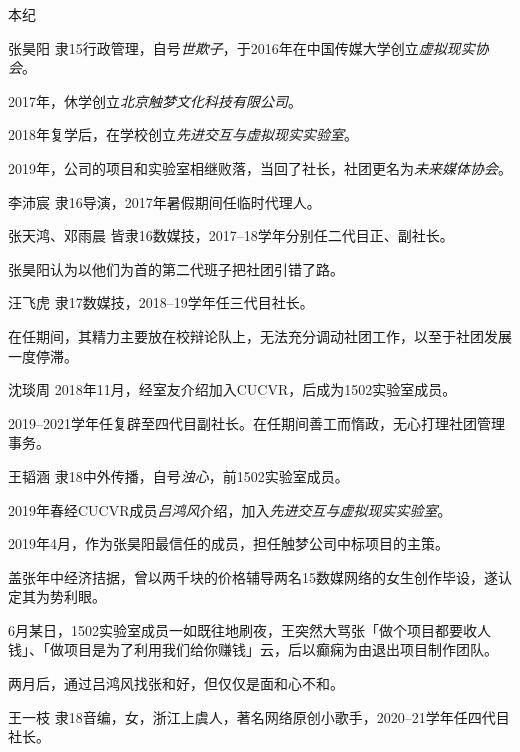 \documentclass{paper}
\newcommand{\name}[1]{{\em #1}}
\begin{document}
\newpage
\begin{section}{本纪}
	\begin{subsection}{张昊阳}
		隶15行政管理，自号\name{世欺子}，于2016年在中国传媒大学创立\name{虚拟现实协会}。

		2017年，休学创立\name{北京触梦文化科技有限公司}。

		2018年复学后，在学校创立\name{先进交互与虚拟现实实验室}。

		2019年，公司的项目和实验室相继败落，当回了社长，社团更名为\name{未来媒体协会}。
	\end{subsection}
	\begin{subsection}{李沛宸}
		隶16导演，2017年暑假期间任临时代理人。
	\end{subsection}
	\begin{subsection}{张天鸿、邓雨晨}
		皆隶16数媒技，2017--18学年分别任二代目正、副社长。

		张昊阳认为以他们为首的第二代班子把社团引错了路。
	\end{subsection}
	\begin{subsection}{汪飞虎}
		隶17数媒技，2018--19学年任三代目社长。
		
		在任期间，其精力主要放在校辩论队上，无法充分调动社团工作，以至于社团发展一度停滞。
	\end{subsection}
	\begin{subsection}{沈琰周}
		2018年11月，经室友介绍加入CUCVR，后成为1502实验室成员。
		
		2019--2021学年任复辟至四代目副社长。在任期间善工而惰政，无心打理社团管理事务。
	\end{subsection}
	\begin{subsection}{王韬涵}
		隶18中外传播，自号\name{浊心}，前1502实验室成员。

		2019年春经CUCVR成员\name{吕鸿风}介绍，加入\name{先进交互与虚拟现实实验室}。

		2019年4月，作为张昊阳最信任的成员，担任触梦公司中标项目的主策。

		盖张年中经济拮据，曾以两千块的价格辅导两名15数媒网络的女生创作毕设，遂认定其为势利眼。

		6月某日，1502实验室成员一如既往地刷夜，王突然大骂张「做个项目都要收人钱」、「做项目是为了利用我们给你赚钱」云，后以癫痫为由退出项目制作团队。

		两月后，通过吕鸿风找张和好，但仅仅是面和心不和。
	\end{subsection}
	\begin{subsection}{王一枝}
		隶18音编，女，浙江上虞人，著名网络原创小歌手，2020--21学年任四代目社长。


\end{subsection}
\end{section}
\end{document}
